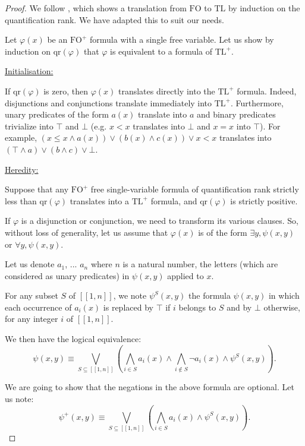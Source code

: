 \documentclass[a4paper,UKenglish,cleveref, autoref, thm-restate]{lipics-v2021}
\newcommand{\FO}{\mathrm{FO}}
\newcommand{\FOp}{\FO^+}
\newcommand{\TL}{\mathrm{TL}}
\newcommand{\TLp}{\TL^+}
\newcommand{\qr}{\mathrm{qr}}
\begin{document}
\begin{proof}


    


    
   

    We follow \cite{FOtoLTL}, which shows a translation from $\FO$ to $\TL$ by induction on the quantification rank. We have adapted this to suit our needs.

    Let $\varphi(x)$ be an $\FOp$ formula with a single free variable. Let us show by induction on $\qr(\varphi)$ that $\varphi$ is equivalent to a formula of $\TLp$.

    \underline{Initialisation:}

    If $\qr(\varphi)$ is zero, then $\varphi(x)$ translates directly into the $\TLp$ formula. Indeed, disjunctions and conjunctions translate immediately into $\TLp$. Furthermore, unary predicates of the form $a(x)$ translate into $a$ and binary predicates trivialize into $\top$ and $\bot$ (e.g. $x<x$ translates into $\bot$ and $x=x$ into $\top$). For example, $(x \leq x \land a(x)) \lor (b(x) \land c(x)) \lor x < x$ translates into $(\top \land a) \lor (b \land c) \lor \bot$.

    \underline{Heredity:}

    Suppose that any $\FOp$ free single-variable formula of quantification rank strictly less than $\qr(\varphi)$ translates into a $\TLp$ formula, and $\qr(\varphi)$ is strictly positive.

    If $\varphi$ is a disjunction or conjunction, we need to transform its various clauses.
    So, without loss of generality, let us assume that $\varphi(x)$ is of the form $\exists y, \psi(x,y)$ or $\forall y, \psi(x,y)$.

    Let us denote $a_1$, ... $a_n$ where $n$ is a natural number, the letters (which are considered as unary predicates) in $\psi(x,y)$ applied to $x$.

    For any subset $S$ of $[\![1,n]\!]$, we note $\psi^S(x,y)$ the formula $\psi(x,y)$ in which each occurrence of $a_i(x)$ is replaced by $\top$ if $i$ belongs to $S$ and by $\bot$ otherwise, for any integer $i$ of $[\![1,n]\!]$.

    We then have the logical equivalence:
    $$
    \psi(x,y) \equiv \bigvee_{S \subseteq [\![1,n]\!]}
    \left(
        \bigwedge_{i \in S} 
        a_i(x) \land \bigwedge_{i \notin S} \neg a_i(x)
        \land \psi^S(x,y)
    \right).
    $$

    We are going to show that the negations in the above formula are optional.
    Let us note:
    $$
    \psi^+(x,y) \equiv \bigvee_{S \subseteq [\![1,n]\!]}
    \left(
        \bigwedge_{i \in S} a_i(x)
    \land \psi^S(x,y)
    \right).
    $$


\end{proof}
\end{document}
